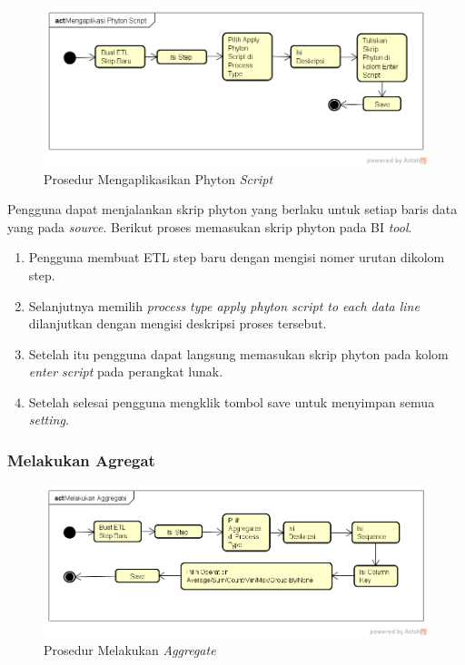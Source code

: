 	\begin{figure}[H]
	\centering
	\includegraphics[scale=0.5]{Gambar/Mengaplikasikan-Phyton-Script}
	\caption{Prosedur Mengaplikasikan Phyton \textit{Script}}

	\end{figure}
	Pengguna dapat menjalankan skrip phyton yang berlaku untuk setiap baris data yang pada \textit{source}.
	Berikut proses memasukan skrip phyton pada BI \textit{tool}.
	\begin{enumerate}
		\item Pengguna membuat ETL step baru dengan mengisi nomer urutan dikolom step.
		\item Selanjutnya memilih \textit{process type apply phyton script to each data line} dilanjutkan dengan mengisi deskripsi proses tersebut.
		\item Setelah itu pengguna dapat langsung memasukan skrip phyton pada kolom \textit{enter script} pada perangkat lunak.
		\item Setelah selesai pengguna mengklik tombol save untuk menyimpan semua \textit{setting}.
	\end{enumerate}
	
\subsubsection{Melakukan Agregat}

	\begin{figure}[H]
	\centering
	\includegraphics[scale=0.5]{Gambar/Melakukan-Aggregate}
	\caption{Prosedur Melakukan \textit{Aggregate}}
	\end{figure}	
	
